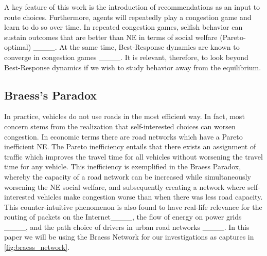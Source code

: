A key feature of this work is the introduction of recommendations as an input to route choices.
Furthermore, agents will repeatedly play a congestion game and learn to do so over time. In repeated congestion games, selfish behavior can sustain outcomes that are better than NE in terms of social welfare (Pareto-optimal) ____. At the same time, Best-Response dynamics are known to converge in congestion games ____. It is relevant, therefore, to look beyond Best-Response dynamics if we wish to study behavior away from the equilibrium. 


\subsection{Braess's Paradox}

In practice, vehicles do not use roads in the most efficient way. In fact, most concern stems from the realization that self-interested choices can worsen congestion. In economic terms there are road networks which have a Pareto inefficient NE. The Pareto inefficiency entails that there exists an assignment of traffic which improves the travel time for all vehicles without worsening the travel time for any vehicle. This inefficiency is exemplified in the Braess Paradox, whereby the capacity of a road network can be increased while simultaneously worsening the NE social welfare, and subsequently creating a network where self-interested vehicles make congestion worse than when there was less road capacity. This counter-intuitive phenomenon is also found to have real-life relevance for the routing of packets on the Internet____, the flow of energy on power grids ____, and the path choice of drivers in urban road networks ____. In this paper we will be using the Braess Network for our investigations as captures in \autoref{fig:braess_network}.

